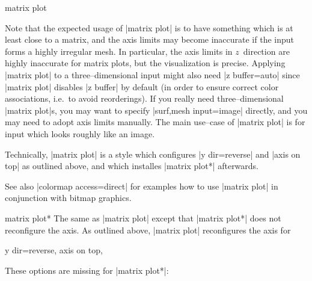{\begin{plottype}[/pgfplots]{matrix plot}
\begin{codeexample}[]
\end{codeexample}
	Note that the expected usage of |matrix plot| is to have something which is at least close to a matrix, and the axis limits may become inaccurate if the input forms a highly irregular mesh. In particular, the axis limits in $z$~direction are highly inaccurate for matrix plots, but the visualization is precise. Applying |matrix plot| to a three--dimensional input might also need |z buffer=auto| since |matrix plot| disables |z buffer| by default (in order to ensure correct color associations, i.e.\ to avoid reorderings). If you really need three--dimensional |matrix plot|s, you may want to specify |surf,mesh input=image| directly, and you may need to adopt axis limits manually. The main use--case of |matrix plot| is for input which looks roughly like an image.
	
	Technically, |matrix plot| is a style which configures |y dir=reverse| and |axis on top| as outlined above, and which installes |matrix plot*| afterwards.

	See also |colormap access=direct| for examples how to use |matrix plot| in conjunction with bitmap graphics.
\end{plottype}

\begin{plottype}{matrix plot*}
	The same as |matrix plot| except that |matrix plot*| does not reconfigure the axis. As outlined above, |matrix plot| reconfigures the axis for
\begin{codeexample}
y dir=reverse,
axis on top,
\end{codeexample}
	
	These options are missing for |matrix plot*|:
\begin{codeexample}[]
\end{codeexample}
\end{plottype}}
